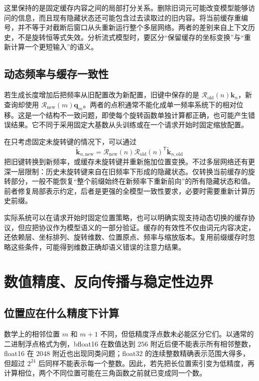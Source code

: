\documentclass[UTF8,12pt,a4paper,fontset=fandol]{ctexart}
\begin{document}
这里保持的是固定缓存内容之间的局部打分关系。删除旧词元可能改变模型能够访问的信息，而且现有隐藏状态还可能包含过去读取过的旧内容。将当前缓存重编号，并不等于对截断后窗口从头重新运行整个多层网络。两者的差别来自上下文历史，不是旋转恒等式失效。分析流式模型时，要区分“保留缓存的坐标变换”与“重新计算一个更短输入”的语义。

\subsection{动态频率与缓存一致性}
若生成长度增加后把频率从旧配置改为新配置，旧键中保存的是 $\mathcal R_{\mathrm{old}}(n)\mathbf k_n$，新查询却使用 $\mathcal R_{\mathrm{new}}(m)\mathbf q_m$。两者的点积通常不能化成单一频率系统下的相对位移。这是一个结构不一致问题，即使每个旋转函数单独计算都正确，也可能产生错误结果。它不同于采用固定大基数从头训练或在一个请求开始时固定缩放配置。

在只考虑固定未旋转键的情况下，可以通过
\begin{equation}
\widetilde{\mathbf k}_{n,\mathrm{new}}
=\mathcal R_{\mathrm{new}}(n)
\mathcal R_{\mathrm{old}}(n)^{\mathsf T}
\widetilde{\mathbf k}_{n,\mathrm{old}}
\label{eq:rope-cache-convert}
\end{equation}
把旧键转换到新频率，或缓存未旋转键并重新施加位置变换。不过多层网络还有更深一层限制：历史未旋转键来自在旧频率下形成的隐藏状态。仅转换当前缓存的旋转部分，一般不能恢复“整个前缀始终在新频率下重新前向”的所有隐藏状态和值。前者修复局部表示约定，后者是更强的全模型一致性要求，必要时需要重新计算历史前缀。

实际系统可以在请求开始时固定位置策略，也可以明确实现支持动态切换的缓存协议，但应把协议作为模型语义的一部分验证。缓存的有效性不仅由词元内容决定，还依赖层、坐标排列、旋转维数、位置原点、频率与缩放版本。复用前缀缓存时忽略这些条件，可能得到维数正确却语义错误的注意力结果。

\section{数值精度、反向传播与稳定性边界}
\label{sec:rope-numerics}

\subsection{位置应在什么精度下计算}
数学上的相邻位置 $m$ 和 $m+1$ 不同，但低精度浮点数未必能区分它们。以通常的二进制浮点格式为例，bfloat16 在数值达到 $256$ 附近后便不能表示所有相邻整数，float16 在 $2048$ 附近也出现同类问题；float32 的连续整数精确表示范围大得多，但超过 $2^{24}$ 后同样不能表示每一个整数。因此，若先把长位置索引变为低精度，再计算相位，两个不同位置可能在三角函数之前就已变成同一个数。
\end{document}
